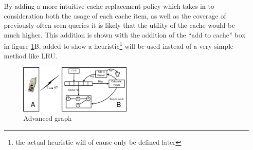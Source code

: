 By adding a more intuitive cache replacement policy which takes in to consideration both the usage of each cache item, as well as the coverage of previously often seen queries it is likely that the utility of the cache would be much higher. This addition is shown with the addition of the "`add to cache"' box in figure \ref{fig:advancedroutequery}B, added to show a heuristic\footnote{the actual heuristic will of cause only be defined later} will be used instead of a very simple method like LRU.




\begin{figure}
  \center
	\includegraphics[width=0.5\textwidth]{figures/advancedroutequery.pdf}
	\caption{Advanced graph}
  \label{fig:advancedroutequery}
\end{figure}



